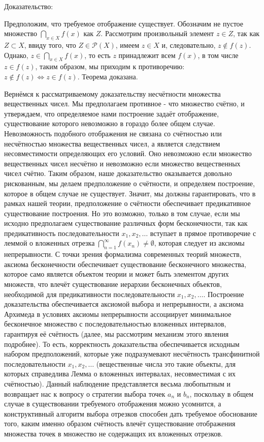 \documentclass[12pt]{article}
\begin{document}
Доказательство:

Предположим, что требуемое отображение существует. Обозначим не пустое множество $\bigcap\limits_{x \in X} f(x)$ как $Z$. Рассмотрим произвольный элемент $z \in Z$, так как $Z \subset X$, ввиду того, что $Z \in \mathcal{P}(X)$, имеем $z \in X$ и, следовательно, $z \notin f(z)$. Однако, $z \in \bigcap\limits_{x \in X} f(x)$, то есть $z$ принадлежит всем $f(x)$, в том числе $z \in f(z)$, таким образом, мы приходим к противоречию: $z \notin f(z) \Leftrightarrow z \in f(z)$. Теорема доказана.

Вернёмся к рассматриваемому доказательству несчётности множества вещественных чисел. Мы предполагаем противное - что множество счётно, и утверждаем, что определяемое нами построение задаёт отображение, существование которого невозможно в гораздо более общем случае. Невозможность подобного отображения не связана со счётностью или несчётностью множества вещественных чисел, а является следствием несовместимости определяющих его условий. Оно невозможно если множество вещественных чисел несчётно и невозможно если множество вещественных чисел счётно. Таким образом, наше доказательство оказывается довольно рискованным, мы делаем предположение о счётности, и определяем построение, которое в общем случае не существует. Значит, мы должны гарантировать, что в рамках нашей теории, предположение о счётности обеспечивает предикативное существование построения. Но это возможно, только в том случае, если мы исходно предполагаем существование различных форм бесконечности, так как предикативность последовательности $x_1, x_2, \dots$ вступает в прямое противоречие с леммой о вложенных отрезка $\bigcap\limits_{n = 1}^{\infty} f(x_n) \neq \emptyset$, которая следует из аксиомы непрерывности. С точки зрения формализма современных теорий множеств, аксиома бесконечности обеспечивает существование бесконечного множества, которое само является объектом теории и может быть элементом других множеств, что влечёт существование иерархии бесконечных объектов, необходимой для предикативности последовательности $x_1, x_2, \dots$. Построение доказательства обеспечивается аксиомой выбора и непрерывности, а аксиома Архимеда в условиях аксиомы непрерывности ассоциирует минимальное бесконечное множество с последовательностью вложенных интервалов, гарантируя её счётность (далее, мы рассмотрим механизм этого явления подробнее). То есть, корректность доказательства обеспечивается исходным набором предположений, которые уже подразумевают несчётность трансфинитной последовательности $x_1, x_2, \dots$ (вещественные числа это такие объекты, для которых справедлива Лемма о вложенных интервалах, несовместимая с их счётностью). Данный наблюдение представляется весьма любопытным и возвращает нас к вопросу о стратегии выбора точек $a_n$ и $b_n$, поскольку в общем случае в существовании требуемого отображения можно усомнится, а конструктивный алгоритм выбора отрезков способен дать требуемое обоснование того, каким именно образом счётность влечёт существование отображения множества точек в множество не содержащих их вложенных отрезков.
\end{document}
